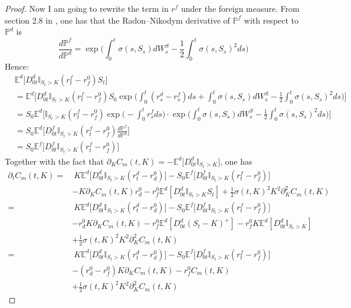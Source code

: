 \begin{proof}
Now I am going to rewrite the term in $r^f$ under the foreign measure. From section 2.8 in \cite{clark}, one has that the Radon–Nikodym derivative of $\mathbb{P}^f$ with respect to $\mathbb{P}^d$ is
$$ \frac{d\mathbb{P}^f}{d\mathbb{P}^d}=\exp\bigg( \int_0^t\sigma(s,S_s) dW^S_s - \frac{1}{2}\int_0^t\sigma(s,S_s)^2 ds\bigg)$$
Hence:
\begin{align*}
& \mathbb{E}^d\big[ D^d_{0t}\mathbb{I}_{S_t>K}(r_t^f - r_f^0 )S_t \big] \\
& = \mathbb{E}^d\bigg[ D^d_{0t}\mathbb{I}_{S_t>K}(r_t^f - r_f^0 )S_0\exp\bigg( \int_0^t (r_s^d - r_s^f)ds + \int_0^t\sigma(s,S_s) dW^S_s - \frac{1}{2}\int_0^t\sigma(s,S_s)^2 ds \bigg) \bigg] \\
& =  S_0\mathbb{E}^d\bigg[\mathbb{I}_{S_t>K}(r_t^f - r_f^0 )\exp\bigg( -\int_0^t r_s^fds\bigg)\cdot\exp\bigg( \int_0^t\sigma(s,S_s) dW^S_s - \frac{1}{2}\int_0^t\sigma(s,S_s)^2 ds \bigg)  \bigg] \\
& =  S_0\mathbb{E}^d\bigg[D^f_{0t}\mathbb{I}_{S_t>K}(r_t^f - r_f^0 )\frac{d\mathbb{P}^f}{d\mathbb{P}^d}\bigg]\\
& =  S_0\mathbb{E}^f\big[D^f_{0t}\mathbb{I}_{S_t>K}(r_t^f - r_f^0 )\big]
\end{align*}
Together with the fact that $\partial_K C_m(t,K)= -\mathbb{E}^d\big[ D^d_{0t}\mathbb{I}_{S_t>K} \big] $, one has
\begin{align*}
\partial_tC_m(t,K) = & \ K\mathbb{E}^d\big[ D^d_{0t}\mathbb{I}_{S_t>K}(r_t^d - r_d^0 )\big] -  S_0\mathbb{E}^f\big[D^f_{0t}\mathbb{I}_{S_t>K}(r_t^f - r_f^0 )\big]\\
&- K \partial_K C_m(t,K)r_d^0 - r_f^0\mathbb{E}^d[D^d_{0t}\mathbb{I}_{S_t>K} S_t]+ \frac{1}{2}\sigma(t,K)^2K^2\partial_K^2C_m(t,K)\\
= & \ K\mathbb{E}^d\big[ D^d_{0t}\mathbb{I}_{S_t>K}(r_t^d - r_d^0 )\big] -  S_0\mathbb{E}^f\big[D^f_{0t}\mathbb{I}_{S_t>K}(r_t^f - r_f^0 )\big]\\
& - r_d^0 K \partial_K C_m(t,K) - r_f^0\mathbb{E}^d[D^d_{0t}(S_t-K)^+]- r_f ^0K\mathbb{E}^d[D^d_{0t}\mathbb{I}_{S_t>K}]\\
& + \frac{1}{2}\sigma(t,K)^2K^2\partial_K^2C_m(t,K)\\
= & \ K\mathbb{E}^d\big[ D^d_{0t}\mathbb{I}_{S_t>K}(r_t^d - r_d^0 )\big] -  S_0\mathbb{E}^f\big[D^f_{0t}\mathbb{I}_{S_t>K}(r_t^f - r_f^0 )\big]\\
& - (r_d^0 - r_f^0) K \partial_K C_m(t,K) - r_f^0 C_m(t,K)  \\
& + \frac{1}{2}\sigma(t,K)^2K^2\partial_K^2C_m(t,K)
\end{align*}

\end{proof}
